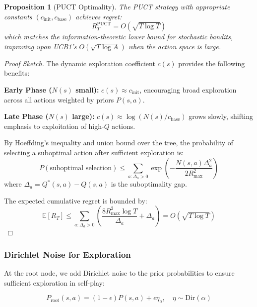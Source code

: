 \documentclass[11pt,a4paper]{article}
\newtheorem{proposition}[theorem]{Proposition}
\newcommand{\E}{\mathbb{E}}
\begin{document}
\begin{proposition}[PUCT Optimality]
\label{prop:puct_optimal}
The PUCT strategy with appropriate constants $(c_{\text{init}}, c_{\text{base}})$ achieves regret:
\begin{equation}
    R_T^{\text{PUCT}} = O\left(\sqrt{T \log T}\right)
\end{equation}
which matches the information-theoretic lower bound for stochastic bandits, improving upon UCB1's $O(\sqrt{T \log A})$ when the action space is large.
\end{proposition}

\begin{proof}[Proof Sketch]
The dynamic exploration coefficient $c(s)$ provides the following benefits:

\textbf{Early Phase ($N(s)$ small):} $c(s) \approx c_{\text{init}}$, encouraging broad exploration across all actions weighted by priors $P(s,a)$.

\textbf{Late Phase ($N(s)$ large):} $c(s) \approx \log(N(s)/c_{\text{base}})$ grows slowly, shifting emphasis to exploitation of high-$Q$ actions.

By Hoeffding's inequality and union bound over the tree, the probability of selecting a suboptimal action after sufficient exploration is:
\begin{equation}
    P(\text{suboptimal selection}) \leq \sum_{a: \Delta_a > 0} \exp\left(-\frac{N(s,a) \Delta_a^2}{2R_{\max}^2}\right)
\end{equation}
where $\Delta_a = Q^*(s,a) - Q(s,a)$ is the suboptimality gap.

The expected cumulative regret is bounded by:
\begin{equation}
    \E[R_T] \leq \sum_{a: \Delta_a > 0} \left(\frac{8R_{\max}^2 \log T}{\Delta_a} + \Delta_a\right) = O(\sqrt{T \log T})
\end{equation}
\end{proof}

\subsubsection{Dirichlet Noise for Exploration}

At the root node, we add Dirichlet noise to the prior probabilities to ensure sufficient exploration in self-play:

\begin{equation}
    P_{\text{root}}(s,a) = (1-\epsilon) P(s,a) + \epsilon \eta_a, \quad \eta \sim \text{Dir}(\alpha)
\end{equation}
\end{document}
